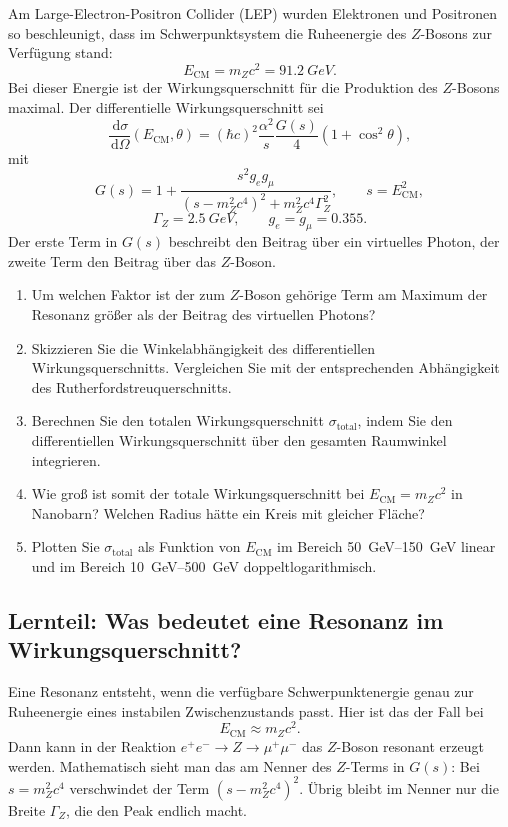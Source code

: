 \documentclass[11pt,a4paper]{scrartcl}
\newcommand{\paren}[1]{\left( #1 \right)}
\newcommand{\dd}{\,\mathrm{d}}
\newcommand{\diffxs}{\frac{\dd\sigma}{\dd\Omega}}
\theoremstyle{definition}
\theoremstyle{plain}
\theoremstyle{remark}
\begin{document}
\begin{taskbox}
Am Large-Electron-Positron Collider (LEP) wurden Elektronen und Positronen so beschleunigt, dass im Schwerpunktsystem die Ruheenergie des $Z$-Bosons zur Verfügung stand:
\[
    E_{\mathrm{CM}}=m_Zc^2=\SI{91.2}{GeV}.
\]
Bei dieser Energie ist der Wirkungsquerschnitt für die Produktion des $Z$-Bosons maximal. Der differentielle Wirkungsquerschnitt sei
\[
    \diffxs(E_{\mathrm{CM}},\theta)
    =(\hbar c)^2\frac{\alpha^2}{s}\frac{G(s)}{4}\paren{1+\cos^2\theta},
\]
mit
\[
    G(s)=1+\frac{s^2g_eg_\mu}{\paren{s-m_Z^2c^4}^2+m_Z^2c^4\Gamma_Z^2},
    \qquad
    s=E_{\mathrm{CM}}^2,
\]
\[
    \Gamma_Z=\SI{2.5}{GeV},
    \qquad
    g_e=g_\mu=0.355.
\]
Der erste Term in $G(s)$ beschreibt den Beitrag über ein virtuelles Photon, der zweite Term den Beitrag über das $Z$-Boson.
\begin{enumerate}[label=(\alph*)]
    \item Um welchen Faktor ist der zum $Z$-Boson gehörige Term am Maximum der Resonanz größer als der Beitrag des virtuellen Photons?
    \item Skizzieren Sie die Winkelabhängigkeit des differentiellen Wirkungsquerschnitts. Vergleichen Sie mit der entsprechenden Abhängigkeit des Rutherfordstreuquerschnitts.
    \item Berechnen Sie den totalen Wirkungsquerschnitt $\sigma_{\mathrm{total}}$, indem Sie den differentiellen Wirkungsquerschnitt über den gesamten Raumwinkel integrieren.
    \item Wie groß ist somit der totale Wirkungsquerschnitt bei $E_{\mathrm{CM}}=m_Zc^2$ in Nanobarn? Welchen Radius hätte ein Kreis mit gleicher Fläche?
    \item Plotten Sie $\sigma_{\mathrm{total}}$ als Funktion von $E_{\mathrm{CM}}$ im Bereich \SIrange{50}{150}{GeV} linear und im Bereich \SIrange{10}{500}{GeV} doppeltlogarithmisch.
\end{enumerate}
\end{taskbox}

\subsection{Lernteil: Was bedeutet eine Resonanz im Wirkungsquerschnitt?}

\begin{learningbox}
Eine Resonanz entsteht, wenn die verfügbare Schwerpunktenergie genau zur Ruheenergie eines instabilen Zwischenzustands passt. Hier ist das der Fall bei
\[
    E_{\mathrm{CM}}\approx m_Zc^2.
\]
Dann kann in der Reaktion $e^+e^-\to Z\to \mu^+\mu^-$ das $Z$-Boson resonant erzeugt werden. Mathematisch sieht man das am Nenner des $Z$-Terms in $G(s)$: Bei $s=m_Z^2c^4$ verschwindet der Term $(s-m_Z^2c^4)^2$. Übrig bleibt im Nenner nur die Breite $\Gamma_Z$, die den Peak endlich macht.
\end{learningbox}
\end{document}
